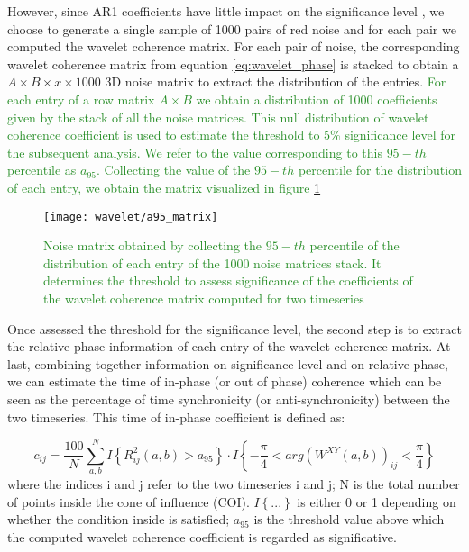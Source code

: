 \documentclass[11pt]{report}
\begin{document}
However, since AR1 coefficients have little impact on the significance level \cite{grinsted-2004}, we choose to generate a single sample of 1000 pairs of red noise and for each pair we computed the wavelet coherence matrix.
For each pair of noise, the corresponding wavelet coherence matrix from equation \ref{eq:wavelet_phase} is stacked to obtain a $A\times B \times x \times 1000$ 3D noise matrix to extract the distribution of the entries.
\textcolor{ForestGreen}{
For each entry of a row matrix $A \times B$ we obtain a distribution of 1000 coefficients given by the stack of all the noise matrices.
This null distribution of wavelet coherence coefficient is used to estimate the threshold to 5\% significance level for the subsequent analysis.
We refer to the value corresponding to this $95-th$ percentile as $a_{95}$.
Collecting the value of the $95-th$ percentile for the distribution of each entry, we obtain the matrix visualized in figure \ref{fig:a95_matrix}
}


\begin{figure}
\centering
\texttt{[image: wavelet/a95\_matrix]}
\caption{\textcolor{ForestGreen}{Noise matrix obtained by collecting the $95-th$ percentile of the distribution of each entry of the 1000 noise matrices stack. It determines the threshold to assess significance of the coefficients of the wavelet coherence matrix computed for two timeseries}}
\label{fig:a95_matrix}
\end{figure}




Once assessed the threshold for the significance level, the second step is to extract the relative phase information of each entry of the wavelet coherence matrix.
At last, combining together information on significance level and on relative phase, we can estimate the time of in-phase (or out of phase) coherence which can be seen as the percentage of time synchronicity (or anti-synchronicity) between the two timeseries. \cite{bernas-2018}
This time of in-phase coefficient is defined as:

\begin{equation} \label{eq:wavelet_inphase}
c_{ij} = \frac{100}{N}\sum_{a, b}^N I\left\{ R_{ij}^2(a,b) > a_{95}\right\}\cdot I\left\{-\frac{\pi}{4}<arg(W^{XY}(a, b))_{ij} < \frac{\pi}{4}  \right\}
\end{equation}
where the indices i and j refer to the two timeseries i and j; N is the total number of points inside the cone of influence (COI).
$I\left\{ ...\right\}$ is either 0 or 1 depending on whether the condition inside is satisfied;
$a_{95}$ is the threshold value above which the computed wavelet coherence coefficient is regarded as significative.
\end{document}
